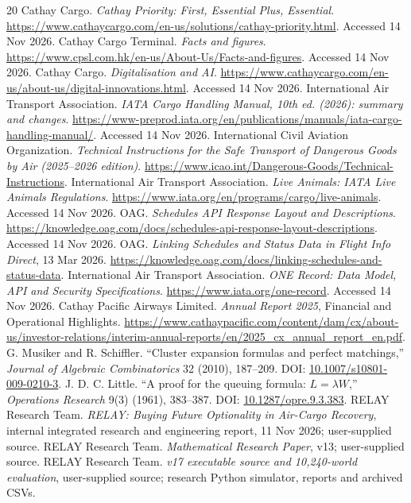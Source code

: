 \documentclass[10pt,a4paper]{article}
\theoremstyle{definition}\newtheorem{definition}[theorem]{Definition}
\theoremstyle{remark}\newtheorem{remark}[theorem]{Remark}
\newcommand{\1}{\mathbbm 1}
\begin{document}
\begin{thebibliography}{20}\small
{} Cathay Cargo. \emph{Cathay Priority: First, Essential Plus, Essential}. \url{https://www.cathaycargo.com/en-us/solutions/cathay-priority.html}. Accessed 14 Nov 2026.
 Cathay Cargo Terminal. \emph{Facts and figures}. \url{https://www.cpsl.com.hk/en-us/About-Us/Facts-and-figures}. Accessed 14 Nov 2026.
 Cathay Cargo. \emph{Digitalisation and AI}. \url{https://www.cathaycargo.com/en-us/about-us/digital-innovations.html}. Accessed 14 Nov 2026.
 International Air Transport Association. \emph{IATA Cargo Handling Manual, 10th ed. (2026): summary and changes}. \url{https://www-preprod.iata.org/en/publications/manuals/iata-cargo-handling-manual/}. Accessed 14 Nov 2026.
 International Civil Aviation Organization. \emph{Technical Instructions for the Safe Transport of Dangerous Goods by Air (2025--2026 edition)}. \url{https://www.icao.int/Dangerous-Goods/Technical-Instructions}.
 International Air Transport Association. \emph{Live Animals: IATA Live Animals Regulations}. \url{https://www.iata.org/en/programs/cargo/live-animals}. Accessed 14 Nov 2026.
 OAG. \emph{Schedules API Response Layout and Descriptions}. \url{https://knowledge.oag.com/docs/schedules-api-response-layout-descriptions}. Accessed 14 Nov 2026.
 OAG. \emph{Linking Schedules and Status Data in Flight Info Direct}, 13 Mar 2026. \url{https://knowledge.oag.com/docs/linking-schedules-and-status-data}.
 International Air Transport Association. \emph{ONE Record: Data Model, API and Security Specifications}. \url{https://www.iata.org/one-record}. Accessed 14 Nov 2026.
 Cathay Pacific Airways Limited. \emph{Annual Report 2025}, Financial and Operational Highlights. \url{https://www.cathaypacific.com/content/dam/cx/about-us/investor-relations/interim-annual-reports/en/2025_cx_annual_report_en.pdf}.
 G. Musiker and R. Schiffler. ``Cluster expansion formulas and perfect matchings,'' \emph{Journal of Algebraic Combinatorics} 32 (2010), 187--209. DOI: \href{https://doi.org/10.1007/s10801-009-0210-3}{10.1007/s10801-009-0210-3}.
 J. D. C. Little. ``A proof for the queuing formula: $L=\lambda W$,'' \emph{Operations Research} 9(3) (1961), 383--387. DOI: \href{https://doi.org/10.1287/opre.9.3.383}{10.1287/opre.9.3.383}.
 RELAY Research Team. \emph{RELAY: Buying Future Optionality in Air-Cargo Recovery}, internal integrated research and engineering report, 11 Nov 2026; user-supplied source.
 RELAY Research Team. \emph{Mathematical Research Paper}, v13; user-supplied source.
 RELAY Research Team. \emph{v17 executable source and 10,240-world evaluation}, user-supplied source; research Python simulator, reports and archived CSVs.
\end{thebibliography}
\end{document}
